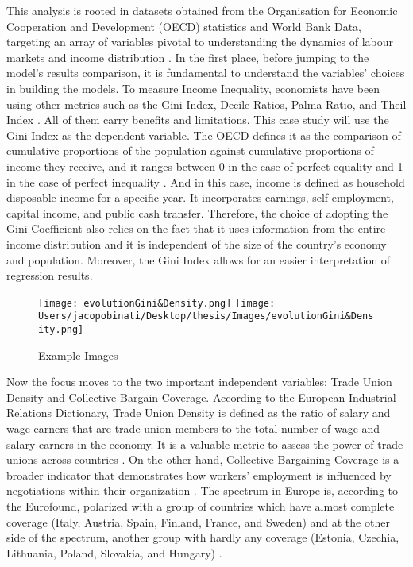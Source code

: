 \documentclass{article}
\begin{document}
This analysis is rooted in datasets obtained from the Organisation for Economic Cooperation and Development (OECD) statistics and World Bank Data, targeting an array of variables pivotal to understanding the dynamics of labour markets and income distribution \cite{Trapeznikova2019}. In the first place, before jumping to the model’s results comparison, it is fundamental to understand the variables' choices in building the models. To measure Income Inequality, economists have been using other metrics such as the Gini Index, Decile Ratios, Palma Ratio, and Theil Index \cite{Trapeznikova2019}. All of them carry benefits and limitations. This case study will use the Gini Index as the dependent variable. The OECD defines it as the comparison of cumulative proportions of the population against cumulative proportions of income they receive, and it ranges between 0 in the case of perfect equality and 1 in the case of perfect inequality \cite{OECDData}. And in this case, income is defined as household disposable income for a specific year. It incorporates earnings, self-employment, capital income, and public cash transfer. Therefore, the choice of adopting the Gini Coefficient also relies on the fact that it uses information from the entire income distribution and it is independent of the size of the country’s economy and population. Moreover, the Gini Index allows for an easier interpretation of regression results.

\begin{figure}[htbp]
    \centering
    \texttt{[image: evolutionGini\&Density.png]}
    \texttt{[image: Users/jacopobinati/Desktop/thesis/Images/evolutionGini\&Density.png]}
    \caption{Example Images}
    \label{fig:example}
\end{figure}

Now the focus moves to the two important independent variables: Trade Union Density and Collective Bargain Coverage. According to the European Industrial Relations Dictionary, Trade Union Density is defined as the ratio of salary and wage earners that are trade union members to the total number of wage and salary earners in the economy. It is a valuable metric to assess the power of trade unions across countries \cite{EuroFound2019}. On the other hand, Collective Bargaining Coverage is a broader indicator that demonstrates how workers' employment is influenced by negotiations within their organization \cite{EuroFound2022}. The spectrum in Europe is, according to the Eurofound, polarized with a group of countries which have almost complete coverage (Italy, Austria, Spain, Finland, France, and Sweden) and at the other side of the spectrum, another group with hardly any coverage (Estonia, Czechia, Lithuania, Poland, Slovakia, and Hungary) \cite{EuroFound2022} \cite{BentalDemougin2010}.
\end{document}
